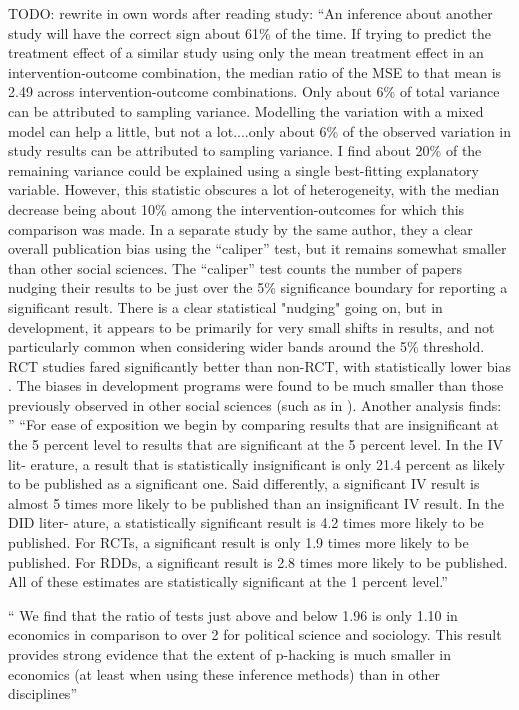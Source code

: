 \documentclass[12pt,a4paper]{article}
\begin{document}
TODO: rewrite in own words after reading study: ``An inference about another study will have the correct sign
about 61\% of the time. If trying to predict the treatment effect of a similar study using
only the mean treatment effect in an intervention-outcome
combination, the median ratio of the MSE to that mean is 2.49 across intervention-outcome combinations. Only about 6\% of total variance can be attributed to sampling variance. Modelling the variation with a mixed model can help a little,
but not a lot....only about 6\% of the observed variation in study results can be attributed to sampling
variance. I find about 20\% of the remaining variance could be explained using a single
best-fitting explanatory variable. However, this statistic obscures a lot of heterogeneity,
with the median decrease being about 10\% among the intervention-outcomes for which
this comparison was made. In a separate study by the same author, they a clear overall publication bias using the ``caliper'' test, but it remains somewhat smaller than other social sciences. The ``caliper'' test counts the number of papers nudging their results to be just over the 5\% significance boundary for reporting a significant result. There is a clear statistical "nudging" going on, but in development, it appears to be primarily for very small shifts in results, and not particularly common when considering wider bands around the 5\% threshold. RCT studies fared significantly better than non-RCT, with statistically lower bias . The biases in development programs were found to be much smaller than those previously observed in other social sciences (such as in ). Another analysis finds:
''
``For ease of exposition we begin by comparing results that are insignificant at the
5 percent level to results that are significant at the 5 percent level. In the IV lit-
erature, a result that is statistically insignificant is only 21.4 percent as likely to
be published as a significant one. Said differently, a significant IV result is almost
5 times more likely to be published than an insignificant IV result. In the DID liter-
ature, a statistically significant result is 4.2 times more likely to be published. For
RCTs, a significant result is only 1.9 times more likely to be published. For RDDs,
a significant result is 2.8 times more likely to be published. All of these estimates
are statistically significant at the 1 percent level.''

``  We find that the ratio of tests just above and below 1.96 is only 1.10 in economics in
  comparison to over 2 for political science and sociology. This result provides strong
  evidence that the extent of p-hacking is much smaller in economics (at least when
  using these inference methods) than in other disciplines''
\end{document}
